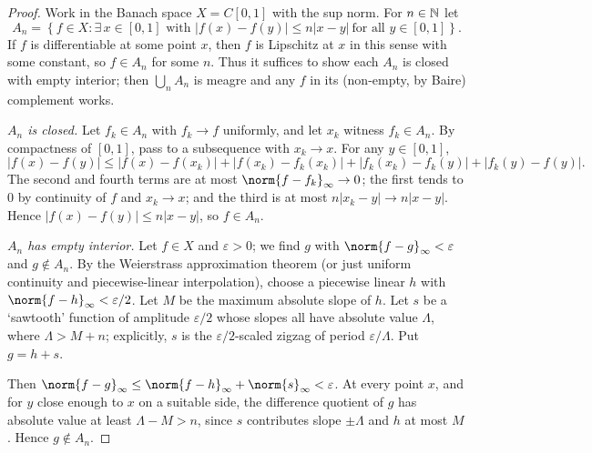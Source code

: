 \documentclass[a4paper]{scrartcl}
\begin{document}
\begin{proof}
	Work in the Banach space $X = C[0,1]$ with the sup norm. For $n \in \mathbb{N}$ let
	$$A_n = \left\{ f \in X : \exists\, x \in [0,1] \text{ with } |f(x) - f(y)| \leq n|x-y| \ \text{for all } y \in [0,1] \right\}.$$
	If $f$ is differentiable at some point $x$, then $f$ is Lipschitz at $x$ in this sense with some constant, so $f \in A_n$ for some $n$. Thus it suffices to show each $A_n$ is closed with empty interior; then $\bigcup_n A_n$ is meagre and any $f$ in its (non-empty, by Baire) complement works.

	\emph{$A_n$ is closed.} Let $f_k \in A_n$ with $f_k \to f$ uniformly, and let $x_k$ witness $f_k \in A_n$. By compactness of $[0,1]$, pass to a subsequence with $x_k \to x$. For any $y \in [0,1]$,
	$$|f(x) - f(y)| \leq |f(x) - f(x_k)| + |f(x_k) - f_k(x_k)| + |f_k(x_k) - f_k(y)| + |f_k(y) - f(y)|.$$
	The second and fourth terms are at most $\norm{f - f_k}_\infty \to 0$; the first tends to $0$ by continuity of $f$ and $x_k \to x$; and the third is at most $n|x_k - y| \to n|x - y|$. Hence $|f(x)-f(y)| \leq n|x-y|$, so $f \in A_n$.

	\emph{$A_n$ has empty interior.} Let $f \in X$ and $\varepsilon > 0$; we find $g$ with $\norm{f - g}_\infty < \varepsilon$ and $g \notin A_n$. By the Weierstrass approximation theorem (or just uniform continuity and piecewise-linear interpolation), choose a piecewise linear $h$ with $\norm{f - h}_\infty < \varepsilon/2$. Let $M$ be the maximum absolute slope of $h$. Let $s$ be a `sawtooth' function of amplitude $\varepsilon/2$ whose slopes all have absolute value $\Lambda$, where $\Lambda > M + n$; explicitly, $s$ is the $\varepsilon/2$-scaled zigzag of period $\varepsilon/\Lambda$. Put $g = h + s$.

	Then $\norm{f - g}_\infty \leq \norm{f-h}_\infty + \norm{s}_\infty < \varepsilon$. At every point $x$, and for $y$ close enough to $x$ on a suitable side, the difference quotient of $g$ has absolute value at least $\Lambda - M > n$, since $s$ contributes slope $\pm \Lambda$ and $h$ at most $M$. Hence $g \notin A_n$.
\end{proof}
\end{document}
